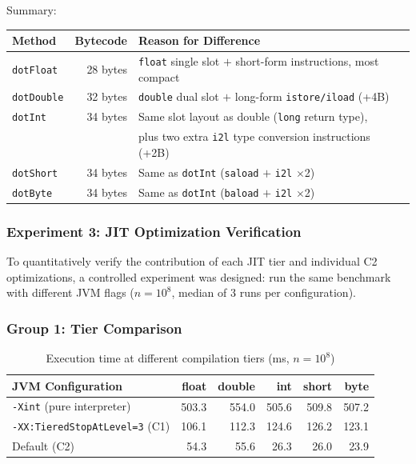\documentclass[12pt,a4paper]{article}
\begin{document}
Summary:

\begin{table}[H]
\centering
\begin{tabular}{l r l}
\toprule
Method & Bytecode & Reason for Difference \\
\midrule
\texttt{dotFloat}  & 28 bytes & \texttt{float} single slot $+$ short-form instructions, most compact \\
\texttt{dotDouble} & 32 bytes & \texttt{double} dual slot $+$ long-form \texttt{istore/iload} (+4B) \\
\texttt{dotInt}    & 34 bytes & Same slot layout as double (\texttt{long} return type),\\
                   &          & plus two extra \texttt{i2l} type conversion instructions (+2B) \\
\texttt{dotShort}  & 34 bytes & Same as \texttt{dotInt} (\texttt{saload} $+$ \texttt{i2l} $\times$2) \\
\texttt{dotByte}   & 34 bytes & Same as \texttt{dotInt} (\texttt{baload} $+$ \texttt{i2l} $\times$2) \\
\bottomrule
\end{tabular}
\end{table}

\subsubsection{Experiment 3: JIT Optimization Verification}

To quantitatively verify the contribution of each JIT tier and individual C2 optimizations, a controlled experiment was designed: run the same benchmark with different JVM flags ($n = 10^8$, median of 3 runs per configuration).

\subsubsection*{Group 1: Tier Comparison}

\begin{table}[H]
\centering
\begin{tabular}{l r r r r r}
\toprule
JVM Configuration & float & double & int & short & byte \\
\midrule
\texttt{-Xint} (pure interpreter)              & 503.3 & 554.0 & 505.6 & 509.8 & 507.2 \\
\texttt{-XX:TieredStopAtLevel=3} (C1)          & 106.1 & 112.3 & 124.6 & 126.2 & 123.1 \\
Default (C2)                                    & 54.3  & 55.6  & 26.3  & 26.0  & 23.9  \\
\bottomrule
\end{tabular}
\caption{Execution time at different compilation tiers (ms, $n=10^8$)}
\end{table}
\end{document}
